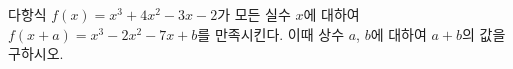 다항식 $f(x)=x^3+4x^2-3x-2$가 모든 실수 $x$에 대하여 $f(x+a)=x^3-2x^2-7x+b$를 만족시킨다. 이때 상수 $a$, $b$에 대하여 $a+b$의 값을 구하시오.

